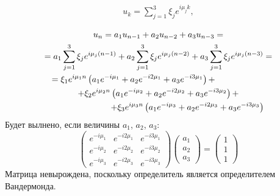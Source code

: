 \begin{gather}
    u_k = \sum_{j=1}^3 \xi_j e^{i \mu_j k} , \\
\end{gather}
\begin{multline*}
    u_n = a_1 u_{n-1} + a_2 u_{n-2} + a_3 u_{n-3} = \\
    = a_1 \sum_{j=1}^3 \xi_j e^{i \mu_j (n-1)} + a_2 \sum_{j=1}^3 \xi_j e^{i \mu_j (n-2)} + a_3 \sum_{j=1}^3 \xi_j e^{i \mu_j (n-3)} = \\
    \shoveleft{= \xi_1 e^{i \mu_1 n} \left ( a_1 e^{- i \mu_1} + a_2 e^{- i 2 \mu_1} + a_3 e^{- i 3 \mu_1} \right) +} \\
    + \xi_2 e^{i \mu_2 n} \left ( a_1 e^{- i \mu_2} + a_2 e^{- i 2 \mu_2} + a_3 e^{- i 3 \mu_2} \right) + \\
    \shoveright{+ \xi_3 e^{i \mu_3 n} \left ( a_1 e^{- i \mu_3} + a_2 e^{- i 2 \mu_3} + a_3 e^{- i 3 \mu_3} \right)} \\
\end{multline*}
Будет вылнено, если величины $a_1$, $a_2$, $a_3$:
\[
    \begin{pmatrix}
        e^{- i \mu_1} & e^{- i 2 \mu_1} & e^{- i 3 \mu_1} \\
        e^{- i \mu_2} & e^{- i 2 \mu_2} & e^{- i 3 \mu_2} \\
        e^{- i \mu_3} & e^{- i 2 \mu_3} & e^{- i 3 \mu_3}
    \end{pmatrix}
    \begin{pmatrix}
        a_1 \\
        a_2 \\
        a_3
    \end{pmatrix}
    = \begin{pmatrix}
        1 \\
        1 \\
        1
    \end{pmatrix}
\]
Матрица невырождена, поскольку определитель является определителем Вандермонда.
